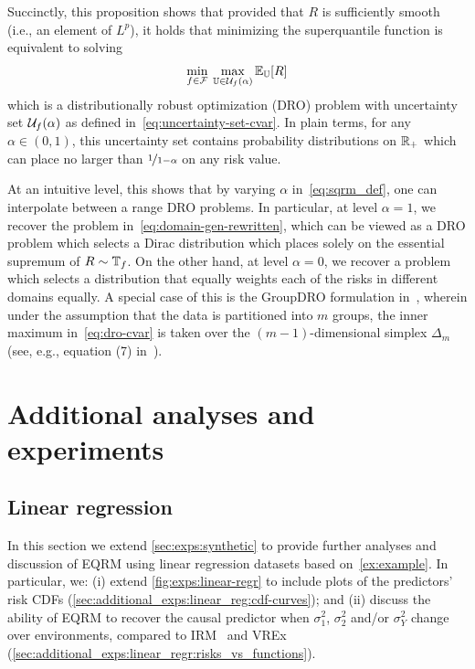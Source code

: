\documentclass{article}
\begin{document}
Succinctly, this proposition shows that provided that $R$ is sufficiently smooth (i.e., an element of $L^p$), it holds that minimizing the superquantile function is equivalent to solving
%
\begin{align}
    \min_{f\in\mathcal{F}} \: \max_{\mathbb{U}\in\mathcal{U}_f(\alpha)} \operatorname{\mathbb{E}}_{\mathbb{U}}[R] \label{eq:dro-cvar}
\end{align}
%
which is a distributionally robust optimization (DRO) problem with uncertainty set $\mathcal{U}_f(\alpha)$ as defined in~\eqref{eq:uncertainty-set-cvar}.  In plain terms, for any $\alpha\in(0,1)$, this uncertainty set contains probability distributions on $\mathbb{R}_+$ which can place no larger than $\nicefrac{1}{1-\alpha}$ on any risk value. 

At an intuitive level, this shows that by varying $\alpha$ in~\cref{eq:sqrm_def},
one can interpolate between a range DRO problems.  In particular, at level $\alpha=1$, we recover the problem in~\eqref{eq:domain-gen-rewritten}, which can be viewed as a DRO problem which selects a Dirac distribution which places solely on the essential supremum of $R\sim\mathbb{T}_f$.  On the other hand, at level $\alpha=0$, we recover a problem which selects a distribution that equally weights each of the risks in different domains equally.  A special case of this is the GroupDRO formulation in~\cite{sagawa2019distributionally}, wherein under the assumption that the data is partitioned into $m$ groups, the inner maximum in~\eqref{eq:dro-cvar} is taken over the $(m-1)$-dimensional simplex $\Delta_m$ (see, e.g., equation (7) in~\cite{sagawa2019distributionally}).

%

%
%
%
%
%
%
%
%
%
%
%

%

%
%
%
%
%
%
%
%
%
%
%
%
%
%
%
%
%
%
%
%
%
%
%
%
%
%
%
%
%
%
%
%
%
%
%
%
%
%
%
%

%

\section{Additional analyses and experiments}%
\label{sec:additional_exps}%
\subsection{Linear regression}%
\label{sec:additional_exps:linear_regr}%
In this section we extend \cref{sec:exps:synthetic} to provide further analyses and discussion of EQRM using linear regression datasets based on~\cref{ex:example}. In particular, we: (i) extend \cref{fig:exps:linear-regr} to include plots of the predictors' risk CDFs (\ref{sec:additional_exps:linear_reg:cdf-curves}); and (ii) discuss the ability of EQRM to recover the causal predictor when $\sigma_1^2$, $\sigma_2^2$ and/or $\sigma_Y^2$ change over environments, compared to IRM~\citep{arjovsky2020invariant} and VREx~\citep{krueger21rex} (\ref{sec:additional_exps:linear_regr:risks_vs_functions}).
\end{document}
